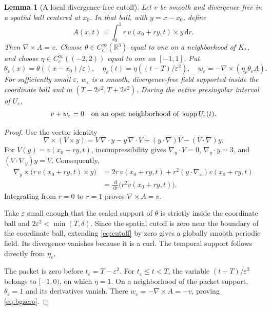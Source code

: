 \documentclass[11pt,a4paper]{article}
\newtheorem{lemma}[theorem]{Lemma}
\theoremstyle{definition}\newtheorem{definition}[theorem]{Definition}
\theoremstyle{remark}\newtheorem{remark}[theorem]{Remark}
\newcommand{\R}{\mathbb R}\newcommand{\TT}{\mathbb T^3}
\newcommand{\dd}{\,\mathrm d}\newcommand{\eps}{\varepsilon}
\DeclareMathOperator{\supp}{supp}
\begin{document}
\begin{lemma}[A local divergence-free cutoff]\label{lem:potential}
Let $v$ be smooth and divergence free in a spatial ball centered at $x_0$. In that ball, with $y=x-x_0$, define
\begin{equation}\label{eq:potential}
 A(x,t)=\int_0^1 r\,v(x_0+ry,t)\times y\dd r.
\end{equation}
Then $\nabla\times A=v$. Choose $\theta\in C_c^\infty(\R^3)$ equal to one on a neighborhood of $K_*$, and choose
$\eta\in C_c^\infty((-2,2))$ equal to one on $[-1,1]$. Put
\begin{equation}\label{eq:cutoff}
 \theta_\eps(x)=\theta((x-x_0)/\eps),\quad
 \eta_\eps(t)=\eta((t-T)/\eps^2),\quad
 w_\eps=-\nabla\times(\eta_\eps\theta_\eps A).
\end{equation}
For sufficiently small $\eps$, $w_\eps$ is a smooth, divergence-free field supported inside the coordinate ball and in
$(T-2\eps^2,T+2\eps^2)$. During the active presingular interval of $U_\eps$,
\begin{equation}\label{eq:bgzero}
 v+w_\eps=0
 \quad\hbox{on an open neighborhood of }\supp U_\eps(t).
\end{equation}
\end{lemma}
\begin{proof}
Use the vector identity
\[
 \nabla\times(V\times y)
 =V\,\nabla\cdot y-y\,\nabla\cdot V
   +(y\cdot\nabla)V-(V\cdot\nabla)y.
\]
For $V(y)=v(x_0+ry,t)$, incompressibility gives $\nabla_y\cdot V=0$,
$\nabla_y\cdot y=3$, and $(V\cdot\nabla_y)y=V$.
Consequently,
\begin{align*}
 \nabla_y\times\bigl(r\,v(x_0+ry,t)\times y\bigr)
 &=2r\,v(x_0+ry,t)+r^2(y\cdot\nabla_x)v(x_0+ry,t)\\
 &=\frac{\dd}{\dd r}\bigl(r^2v(x_0+ry,t)\bigr).
\end{align*}
Integrating from $r=0$ to $r=1$ proves $\nabla\times A=v$.

Take $\eps$ small enough that the scaled support of $\theta$ is strictly inside the coordinate ball and $2\eps^2<\min(T,\delta)$. Since the spatial cutoff is zero near the boundary of the coordinate ball, extending \eqref{eq:cutoff} by zero gives a globally smooth periodic field. Its divergence vanishes because it is a curl. The temporal support follows directly from $\eta_\eps$.

The packet is zero before $t_\eps=T-\eps^2$. For
$t_\eps\le t<T$, the variable $(t-T)/\eps^2$ belongs to $[-1,0)$, on which $\eta=1$. On a neighborhood of the packet support, $\theta_\eps=1$ and its derivatives vanish. There $w_\eps=-\nabla\times A=-v$, proving \eqref{eq:bgzero}.
\end{proof}
\end{document}
